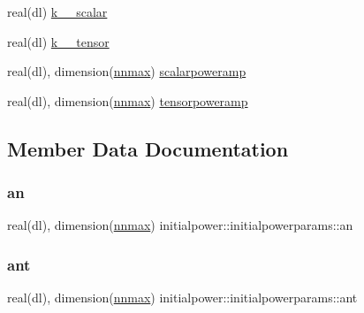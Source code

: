 \begin{DoxyCompactItemize}
\item 
real(dl) \mbox{\hyperlink{structinitialpower_1_1initialpowerparams_a0731b659c2b78a94e325e61c76e137c9}{k\+\_\+\_\+scalar}}
\item 
real(dl) \mbox{\hyperlink{structinitialpower_1_1initialpowerparams_a9acca60c93c1c8d3ebbb059ab6e24d22}{k\+\_\+\_\+tensor}}
\item 
real(dl), dimension(\mbox{\hyperlink{namespaceinitialpower_a9749c023ff83f7ffa2677dc578379c10}{nnmax}}) \mbox{\hyperlink{structinitialpower_1_1initialpowerparams_a091b0ac3914d98a48b9d2bfc0baad28f}{scalarpoweramp}}
\item 
real(dl), dimension(\mbox{\hyperlink{namespaceinitialpower_a9749c023ff83f7ffa2677dc578379c10}{nnmax}}) \mbox{\hyperlink{structinitialpower_1_1initialpowerparams_ae42782122688b96c1d48eda105c2faf9}{tensorpoweramp}}
\end{DoxyCompactItemize}


\subsection{Member Data Documentation}
\mbox{\label{structinitialpower_1_1initialpowerparams_ab9f0c6dad5a3371d714344d07b383999}} 
\subsubsection{\texorpdfstring{an}{an}}
{\footnotesize\ttfamily real(dl), dimension(\mbox{\hyperlink{namespaceinitialpower_a9749c023ff83f7ffa2677dc578379c10}{nnmax}}) initialpower\+::initialpowerparams\+::an\hspace{0.3cm}{\ttfamily [private]}}

\mbox{\label{structinitialpower_1_1initialpowerparams_a1f6bbba14b2a96e869ac7c7c054c0b12}} 
\subsubsection{\texorpdfstring{ant}{ant}}
{\footnotesize\ttfamily real(dl), dimension(\mbox{\hyperlink{namespaceinitialpower_a9749c023ff83f7ffa2677dc578379c10}{nnmax}}) initialpower\+::initialpowerparams\+::ant\hspace{0.3cm}{\ttfamily [private]}}

